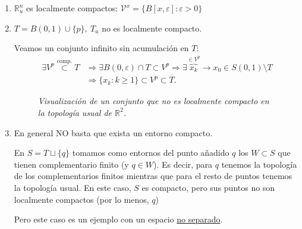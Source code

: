 \begin{ej}
\begin{enumerate}
    \item $\mathbb{R}_u^n$ es localmente compactos: $\mathcal{V}^x = \{B\left[ x, \varepsilon \right] : \varepsilon > 0\}$

    \item $T = B\left( 0, 1 \right) \cup \{p\},\ T_u$ no es localmente compacto.
    \begin{demo}
    Veamos un conjunto infinito sin acumulación en $T$:
    \begin{align*}
        \exists V^p \stackrel{\text{comp.}}{\subset} T &\Rightarrow \exists B\left( 0, \varepsilon \right) \cap T \subset V^p \Rightarrow \exists \overbrace{x_k}^{\in V^p} \rightarrow x_0 \in S\left( 0, 1 \right) \setminus T\\
       &\Rightarrow \{x_k : k \ge 1\} \subset V^p \subset T 
    .\end{align*}
    \end{demo}

    \begin{figure}[H]
        \centering
        \caption{\textit{Visualización de un conjunto que no es localmente compacto en la topología usual de $\mathbb{R}^2$.}}
        \label{fig:usual-no-localmente-compacto}
    \end{figure}

    \item En general NO basta que exista un entorno compacto.

    En $S = T \sqcup \{q\}$ tomamos como entornos del punto añadido $q$ los $W \subset S$ que tienen complementario finito (y $q \in W$). 
    Es decir, para $q$ tenemos la topología de los complementarios finitos mientras que para el resto de puntos tenemos la topología usual.
    En este caso, $S$ es compacto, pero sus puntos no son localmente compactos (por lo menos, $q$)

    Pero este caso es un ejemplo con un espacio \underline{no separado}.
\end{enumerate}
\end{ej}


